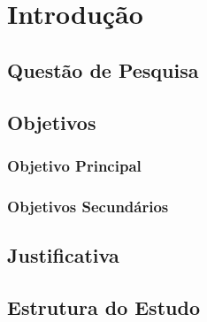 
\chapter[Introdução]{Introdução}

\lipsum[1]

\section{Questão de Pesquisa}
\lipsum[1]

\section{Objetivos}
\lipsum[1]

\subsection{Objetivo Principal}
\lipsum[1]

\subsection{Objetivos Secundários}
\lipsum[1]

\section{Justificativa}
\lipsum[1]

\section{Estrutura do Estudo}
\lipsum[1]

